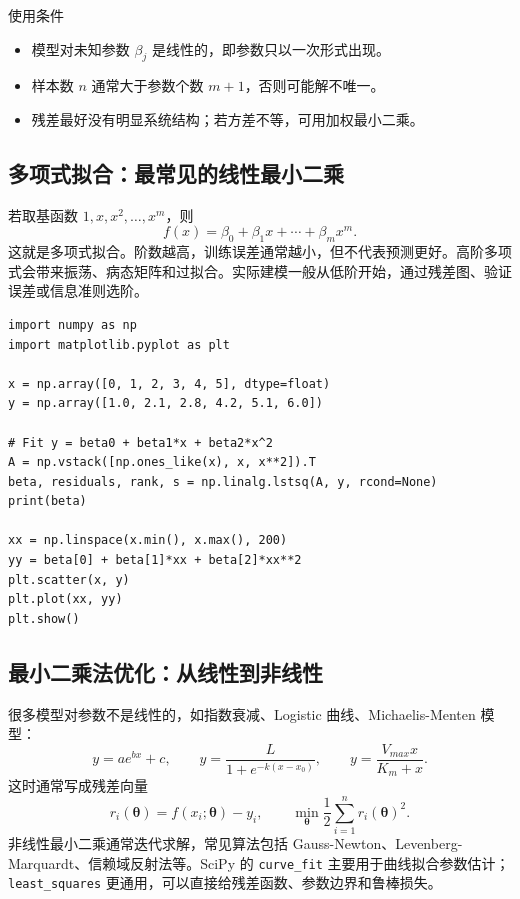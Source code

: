 \documentclass[11pt,a4paper]{ctexart}
\begin{document}
\begin{keybox}{使用条件}
\begin{itemize}
  \item 模型对未知参数 \(\beta_j\) 是线性的，即参数只以一次形式出现。
  \item 样本数 $n$ 通常大于参数个数 $m+1$，否则可能解不唯一。
  \item 残差最好没有明显系统结构；若方差不等，可用加权最小二乘。
\end{itemize}
\end{keybox}

\subsection{多项式拟合：最常见的线性最小二乘}

若取基函数 $1,x,x^2,\ldots,x^m$，则
\[
  f(x)=\beta_0+\beta_1x+\cdots+\beta_mx^m.
\]
这就是多项式拟合。阶数越高，训练误差通常越小，但不代表预测更好。高阶多项式会带来振荡、病态矩阵和过拟合。实际建模一般从低阶开始，通过残差图、验证误差或信息准则选阶。

\begin{lstlisting}
import numpy as np
import matplotlib.pyplot as plt

x = np.array([0, 1, 2, 3, 4, 5], dtype=float)
y = np.array([1.0, 2.1, 2.8, 4.2, 5.1, 6.0])

# Fit y = beta0 + beta1*x + beta2*x^2
A = np.vstack([np.ones_like(x), x, x**2]).T
beta, residuals, rank, s = np.linalg.lstsq(A, y, rcond=None)
print(beta)

xx = np.linspace(x.min(), x.max(), 200)
yy = beta[0] + beta[1]*xx + beta[2]*xx**2
plt.scatter(x, y)
plt.plot(xx, yy)
plt.show()
\end{lstlisting}

\subsection{最小二乘法优化：从线性到非线性}

很多模型对参数不是线性的，如指数衰减、Logistic 曲线、Michaelis-Menten 模型：
\[
  y=a e^{bx}+c,\qquad
  y=\frac{L}{1+e^{-k(x-x_0)}},\qquad
  y=\frac{V_{max}x}{K_m+x}.
\]
这时通常写成残差向量
\[
  r_i(\bm\theta)=f(x_i;\bm\theta)-y_i,
  \qquad
  \min_{\bm\theta}\frac12\sum_{i=1}^n r_i(\bm\theta)^2.
\]
非线性最小二乘通常迭代求解，常见算法包括 Gauss-Newton、Levenberg-Marquardt、信赖域反射法等。SciPy 的 \verb|curve_fit| 主要用于曲线拟合参数估计；\verb|least_squares| 更通用，可以直接给残差函数、参数边界和鲁棒损失。
\end{document}
